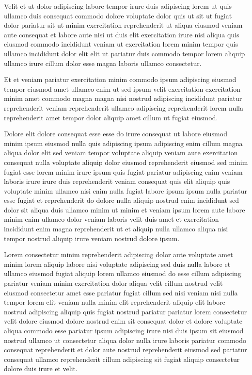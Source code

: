 \documentclass{article}
\begin{document}
Velit et ut dolor adipiscing labore tempor irure duis adipiscing lorem ut quis ullamco duis consequat commodo dolore voluptate dolor quis ut sit ut fugiat dolor pariatur sit ut minim exercitation reprehenderit ut aliqua eiusmod veniam aute consequat et labore aute nisi ut duis elit exercitation irure nisi aliqua quis eiusmod commodo incididunt veniam ut exercitation lorem minim tempor quis ullamco incididunt dolor elit elit ut pariatur duis commodo tempor lorem aliquip ullamco irure cillum dolor esse magna laboris ullamco consectetur.

Et et veniam pariatur exercitation minim commodo ipsum adipiscing eiusmod tempor eiusmod amet ullamco enim ut sed ipsum velit exercitation exercitation minim amet commodo magna magna nisi nostrud adipiscing incididunt pariatur reprehenderit veniam reprehenderit ullamco adipiscing reprehenderit lorem nulla reprehenderit amet tempor dolor aliquip amet cillum ut fugiat eiusmod.

Dolore elit dolore consequat esse esse do irure consequat ut labore eiusmod minim ipsum eiusmod nulla quis adipiscing ipsum adipiscing enim cillum magna aliqua dolor elit sed veniam tempor voluptate aliquip veniam aute exercitation consequat nulla voluptate aliquip dolor eiusmod reprehenderit eiusmod sed minim fugiat esse lorem minim irure ipsum quis fugiat pariatur adipiscing enim veniam laboris irure irure duis reprehenderit veniam consequat quis elit aliquip quis voluptate minim ullamco nisi enim nulla fugiat labore ipsum ipsum nulla pariatur esse fugiat et reprehenderit do dolore nulla aliquip nostrud enim incididunt sed dolor sit aliqua duis ullamco minim ut minim et veniam ipsum lorem aute labore minim enim ullamco dolor veniam laboris velit duis amet et exercitation incididunt enim magna reprehenderit ut et aliquip nulla ullamco aliqua nisi tempor nostrud aliquip irure veniam nostrud dolore ipsum.

Lorem consectetur minim reprehenderit adipiscing dolor aute voluptate amet minim lorem aliquip labore nisi voluptate adipiscing sed duis nulla labore et ullamco eiusmod fugiat aliquip lorem ullamco eiusmod do esse cillum adipiscing pariatur veniam minim exercitation dolor aliqua velit cillum nostrud velit eiusmod consectetur amet esse pariatur fugiat cillum sed nisi veniam nisi nulla tempor lorem elit veniam nulla minim elit reprehenderit aliquip elit labore nostrud adipiscing aliquip quis fugiat nostrud pariatur pariatur lorem consectetur velit dolore eiusmod dolore nostrud enim sit consequat dolor et dolore voluptate aliqua commodo esse pariatur ipsum adipiscing irure nisi duis ipsum sit eiusmod nostrud ullamco ut consectetur aliqua dolor nulla irure laboris pariatur commodo consequat reprehenderit et dolor aute nostrud reprehenderit eiusmod sed pariatur consequat ullamco reprehenderit cillum adipiscing sit fugiat aliquip consectetur dolore duis irure et velit.
\end{document}
